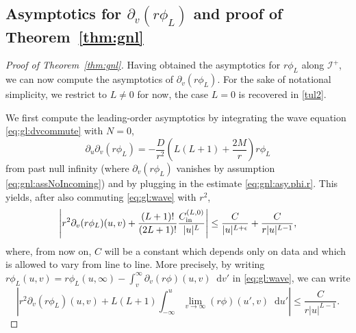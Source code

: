 \documentclass[11pt,english]{article}
\numberwithin{equation}{section}
\theoremstyle{remark}
\theoremstyle{plain}
\theoremstyle{remark}
\newcommand{\dd}{\mathop{}\!\mathrm{d}}
\newcommand{\pu}{\partial_u}
\newcommand{\pv}{\partial_v}
\renewcommand{\(}{\left(}
\renewcommand{\)}{\right)}
\begin{document}
\subsection{Asymptotics for \texorpdfstring{$\pv(r\phi_L)$}{d/dv(r phiL)} and proof of Theorem~\ref{thm:gnl}}
\begin{proof}[Proof of Theorem~\ref{thm:gnl}]
Having obtained the asymptotics for $r\phi_L$ along $\mathcal{I}^+$, we can now compute the asymptotics of $\pv(r\phi_L)$. For the sake of notational simplicity, we restrict to $L\neq 0$ for now, the case $L=0$ is recovered in \eqref{tul2}.

We first compute the leading-order asymptotics by integrating the wave equation \eqref{eq:gl:dvcommute} with $N=0$, 
\begin{equation}\label{eq:gl:wave}
\pu\pv(r\phi_L)=-\frac{D}{r^2}\left(L(L+1)+\frac{2M}{r}\right)r\phi_L
\end{equation}
from past null infinity (where $\pv(r\phi_L)$ vanishes by assumption \eqref{eq:gnl:assNoIncoming}) and by plugging in the estimate \eqref{eq:gnl:asy.phi.r}. This yields, after also commuting \eqref{eq:gl:wave} with $r^2$,
\begin{equation}
\left|	r^2\pv(r\phi_L)(u,v)+\frac{(L+1)!}{(2L+1)!}\frac{\cl{0}}{|u|^L}	\right|\leq \frac{C}{|u|^{L+\epsilon}}+\frac{C}{r|u|^{L-1}},
\end{equation}
where, from now on, $C$ will be a constant which depends only on data and which is allowed to vary from line to line.
More precisely, by writing $r\phi_L(u,v)=r\phi_L(u,\infty)-\int_{v}^\infty\pv(r\phi)(u,v)\dd v'$ in \eqref{eq:gl:wave}, we can write
\begin{equation}
\left|	r^2\pv(r\phi_L)(u,v)+L(L+1)\int_{-\infty}^u \lim_{v\to\infty}(r\phi)(u',v)\dd u'	\right|\leq \frac{C}{r|u|^{L-1}}.
\end{equation}


\end{proof}
\end{document}

